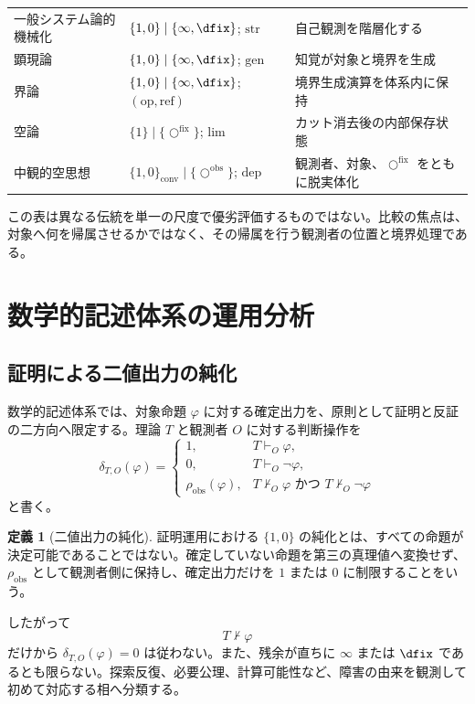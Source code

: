 \documentclass[a4paper,11pt]{ltjsarticle}
\theoremstyle{definition}
\newtheorem{definition}{定義}[section]
\theoremstyle{plain}
\newcommand{\ofix}{\bigcirc^{\mathrm{fix}}}
\newcommand{\oobs}{\bigcirc^{\mathrm{obs}}}
\newcommand{\Residual}{\rho_{\mathrm{obs}}}
\begin{document}
\begin{table}[htbp]
\begin{tabular}{>{\raggedright\arraybackslash}p{} >{\raggedright\arraybackslash}p{} >{\raggedright\arraybackslash}p{}}
一般システム論的機械化 & $\{1,0\}\mid\{\infty,\dfix\}$; $\mathrm{str}$ & 自己観測を階層化する \\
顕現論 & $\{1,0\}\mid\{\infty,\dfix\}$; $\mathrm{gen}$ & 知覚が対象と境界を生成 \\
界論 & $\{1,0\}\mid\{\infty,\dfix\}$; $(\mathrm{op},\mathrm{ref})$ & 境界生成演算を体系内に保持 \\
空論 & $\{1\}\mid\{\ofix\}$; $\mathrm{lim}$ & カット消去後の内部保存状態 \\
中観的空思想 & $\{1,0\}_{\mathrm{conv}}\mid\{\oobs\}$; $\mathrm{dep}$ & 観測者、対象、$\ofix$ をともに脱実体化 \\
\bottomrule
\end{tabular}
\end{table}

この表は異なる伝統を単一の尺度で優劣評価するものではない。比較の焦点は、対象へ何を帰属させるかではなく、その帰属を行う観測者の位置と境界処理である。

\section{数学的記述体系の運用分析}

\subsection{証明による二値出力の純化}

数学的記述体系では、対象命題 $\varphi$ に対する確定出力を、原則として証明と反証の二方向へ限定する。理論 $T$ と観測者 $O$ に対する判断操作を
\[
 \delta_{T,O}(\varphi)
 =
 \begin{cases}
  1,&T\vdash_O\varphi,\\
  0,&T\vdash_O\neg\varphi,\\
  \Residual(\varphi),&
  T\nvdash_O\varphi\text{ かつ }T\nvdash_O\neg\varphi
 \end{cases}
\]
と書く。

\begin{definition}[二値出力の純化]
証明運用における $\{1,0\}$ の純化とは、すべての命題が決定可能であることではない。確定していない命題を第三の真理値へ変換せず、$\Residual$ として観測者側に保持し、確定出力だけを $1$ または $0$ に制限することをいう。
\end{definition}

したがって
\[
 T\nvdash\varphi
\]
だけから $\delta_{T,O}(\varphi)=0$ は従わない。また、残余が直ちに $\infty$ または $\dfix$ であるとも限らない。探索反復、必要公理、計算可能性など、障害の由来を観測して初めて対応する相へ分類する。
\end{document}
